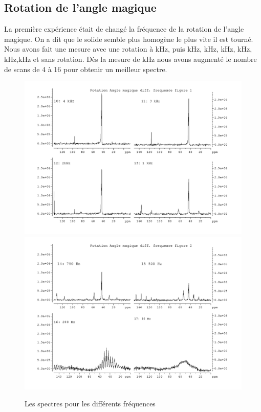 \documentclass[a4paper,12pt]{scrartcl}
\begin{document}
  \subsection{Rotation de l'angle magique}
   La première expérience était de changé la fréquence de la rotation de l'angle magique. On a dit que le solide semble plus homogène le plus vite il est tourné. Nous avons fait une mesure avec une rotation à \unit[4]{kHz}, puis \unit[3]{kHz}, \unit[2]{kHz}, \unit[1]{kHz}, \unit[0,75]{kHz}, \unit[0,5]{kHz},\unit[0,2]{kHz} et sans rotation. Dès la mesure de \unit[0,75]{kHz} nous avons augmenté le nombre de scans de 4 à 16 pour obtenir un meilleur spectre. 
   \begin{figure}
   \includegraphics[width=\textwidth]{bilder/rotation.png}
    \includegraphics[width=\textwidth]{bilder/rotation2.png}
    \caption{\label{rotation}Les spectres pour les différents fréquences}
   \end{figure}
\end{document}
